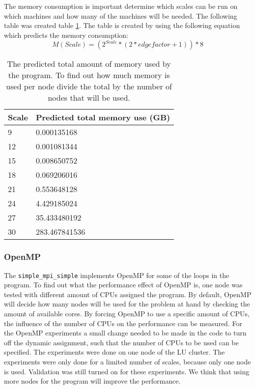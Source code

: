 The memory consumption is important determine which scales can be run on which machines and how many of the machines will be needed. The following table was created table \ref{tab:calculation memory consumption}. The table is created by using the following equation which predicts the memory consumption:
\begin{equation}
M(Scale) = (2^{Scale} *(2*edgefactor + 1)) * 8
\end{equation}
\begin{table} [!h]
	\begin{center}
		\begin{tabular}{|l|l|}
			\hline
			Scale & Predicted total memory use (GB) \\ \hline
			9 &  0.000135168 \\ \hline
			12 & 0.001081344 \\ \hline
			15 & 0.008650752 \\ \hline
			18 & 0.069206016 \\ \hline
			21 & 0.553648128 \\ \hline
			24 & 4.429185024 \\ \hline
			27 & 35.433480192 \\ \hline
			30 & 283.467841536 \\ \hline
		\end{tabular}
	\end{center}
	
	\caption{The predicted total amount of memory used by the program. To find out how much memory is used per node divide the total by the number of nodes that will be used.}
	\label{tab:calculation memory consumption}
\end{table}


\subsubsection{OpenMP}
The \texttt{simple\_mpi\_simple} implements OpenMP for some of the loops in the program. To find out what the performance effect of OpenMP is, one node was tested with different amount of CPUs assigned the program. By default, OpenMP will decide how many nodes will be used for the problem at hand by checking the amount of available cores. By forcing OpenMP to use a specific amount of CPUs, the influence of the number of CPUs on the performance can be measured. For the OpenMP experiments a small change needed to be made in the code to turn off the dynamic assignment, such that the number of CPUs to be used can be specified. The experiments were done on one node of the LU cluster. The experiments were only done for a limited number of scales, because only one node is used. Validation was still turned on for these experiments. We think that using more nodes for the program will improve the performance.

